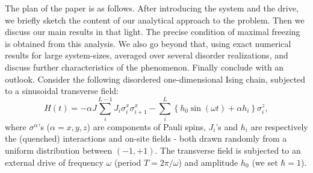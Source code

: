 \documentclass[reprint,preprintnumbers,showpacs,amsmath,twocolumn,showkeys,aps,prl]{revtex4-1}
\begin{document}
The plan of the paper is as follows. After introducing the system and the drive, we briefly
sketch the content of our analytical approach to the problem. Then we discuss our main 
results in that light. The precise condition of maximal freezing is obtained from this
analysis. We also go beyond that, using exact numerical results for large system-sizes, averaged
over several disorder realizations, and discuss further characteristics of the phenomenon. 
Finally conclude with an outlook.
\noindent
Consider the following disordered one-dimensional Ising chain, subjected to a 
sinusoidal transverse field: 
\begin{equation}
H(t) = -\alpha J \sum_{i}^{L-1} J_i \sigma^{x}_{i}\sigma^{x}_{i+1}  
-\sum_{i}^{L} \left\{h_{0}\sin{(\omega t)} + \alpha h_i\right\} \sigma^{z}_{i}, 
\label{H_OBC}
\end{equation}
\noindent where $\sigma^{\alpha}$'s ($\alpha = x,y,z$) are components of Pauli spins, $J_{i}$'s and 
$h_{i}$ are respectively the (quenched) interactions and on-site fields - both drawn randomly 
from a uniform distribution between $\left(-1,+1\right).$
The transverse field is subjected to an external  drive of frequency $\omega$ (period $T = 2\pi/\omega$) 
and amplitude $h_{0}$ (we set $\hbar = 1$).  
\end{document}
